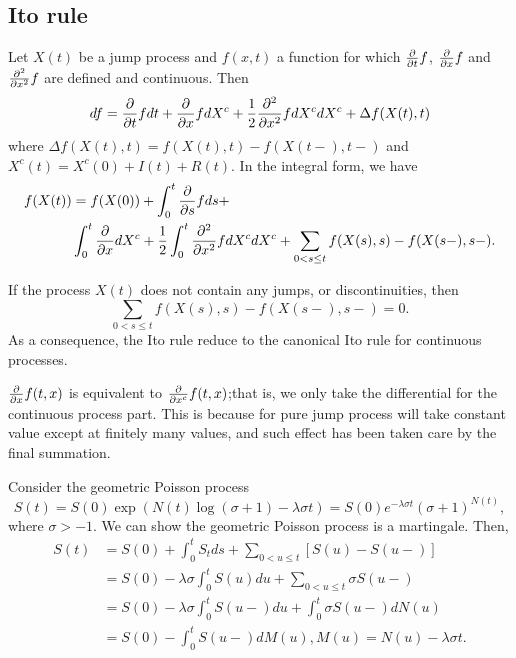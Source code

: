 \begin{refsection}
\begin{remark}[interpretation]
\end{remark}


\subsection{Ito rule}
\begin{lemma}\cite[484]{shreve2004stochastic2}
	Let $X(t)$ be a jump process and $f(x,t)$ a function for which $\frac{\partial}{\partial t}f$, $\frac{\partial}{\partial x}f$ and $\frac{\partial^2}{\partial x^2}f$ are defined and continuous. Then
	$$df = \frac{\partial}{\partial t}f dt + \frac{\partial}{\partial x}fdX^c + \frac{1}{2}\frac{\partial^2}{\partial x^2}f dX^cdX^c + \Delta f(X(t),t)$$
	where $\Delta f(X(t),t) = f(X(t),t) - f(X(t-),t-)$ and $X^c(t) = X^c(0) + I(t) + R(t)$.
	In the integral form, we have
	\begin{align*}
	f(X(t)) &= f(X(0)) + \int_0^t\frac{\partial}{\partial s}f ds +\\
	&\int_0^t\frac{\partial}{\partial x}dX^c + \frac{1}{2}\int_0^t \frac{\partial^2}{\partial x^2}f dX^cdX^c + \sum_{0<s\leq t} f(X(s),s) - f(X(s-),s-).
	\end{align*}
	
\end{lemma}


\begin{remark}[interpretation]
	If the process $X(t)$ does not contain any jumps, or discontinuities, then $$\sum_{0<s\leq t} f(X(s),s) - f(X(s-),s-) = 0.$$
	As a consequence, the Ito rule reduce to the canonical Ito rule for continuous processes.
\end{remark}

\begin{remark}[differentiation]
	$\frac{\partial}{\partial x}f(t,x)$ is equivalent to $\frac{\partial}{\partial x^c}f(t,x)$;that is, we only take the differential for the continuous process part. This is because for pure jump process will take constant value except at finitely many values, and such effect has been taken care by the final summation.
\end{remark}


\begin{example}
	Consider the geometric Poisson process 
	$$S(t)  = S(0)\exp(N(t)\log(\sigma+1) - \lambda \sigma t) = S(0)e^{-\lambda\sigma t}(\sigma+1)^{N(t)},$$
	where $\sigma > -1$. We can show the geometric Poisson process is a martingale.
	Then,
	\begin{align*}
	S(t) &= S(0) + \int_0^t S_t ds + \sum_{0<u\leq t}[S(u) - S(u-)]\\ 
	&= S(0) - \lambda\sigma \int_0^t S(u)du + \sum_{0<u\leq t} \sigma S(u-) \\
	&= S(0) - \lambda\sigma \int_0^t S(u-)du + \int_0^t \sigma S(u-) dN(u) \\
	& = S(0) - \int_0^t S(u-)dM(u), M(u) = N(u) - \lambda\sigma t.
	\end{align*}
	

\end{example}
\end{refsection}
